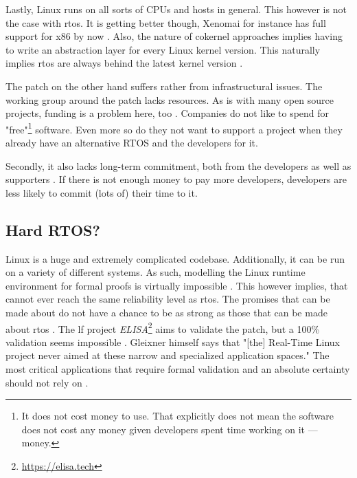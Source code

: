 \documentclass[10pt,twocolumn,a4paper]{article}
\begin{document}
Lastly, Linux runs on all sorts of CPUs and hosts in general.
This however is not the case with \acrshort{rtos}.
It is getting better though, Xenomai for instance has full support for x86 by now \cite{xenomai_supported}.
Also, the nature of cokernel approaches implies having to write an abstraction layer for every Linux kernel version.
This naturally implies \acrshort{rtos} are always behind the latest kernel version \cite{xenomai_versions}.
\newline

\noindent The  patch on the other hand suffers rather from infrastructural issues.
The working group around the patch lacks resources.
As is with many open source projects, funding is a problem here, too \cite{jason_perlow_trenches_2021}.
Companies do not like to spend for "free"\footnote{It does not cost money to use. That explicitly does not mean the software does not cost any money given developers spent time working on it --- money.} software.
Even more so do they not want to support a project when they already have an alternative RTOS and the developers for it.

Secondly, it also lacks long-term commitment, both from the developers as well as supporters \cite{jason_perlow_trenches_2021}.
If there is not enough money to pay more developers, developers are less likely to commit (lots of) their time to it.


\subsection{Hard RTOS?}
Linux is a huge and extremely complicated codebase.
Additionally, it can be run on a variety of different systems.
As such, modelling the Linux runtime environment for formal proofs is virtually impossible \cite{reghenzani_realtime_2019}.
This however implies, that  cannot ever reach the same reliability level as \acrshort{rtos}.
The promises that can be made about  do not have a chance to be as strong as those that can be made about \acrshort{rtos} \cite{reghenzani_realtime_2019}.
The \acrfull{lf} project \emph{ELISA}\footnote{\url{https://elisa.tech}} aims to validate the patch, but a 100\% validation seems impossible \cite{jason_perlow_trenches_2021}.
Gleixner himself says that "[the] Real-Time Linux project never aimed at these narrow and specialized application spaces."\cite{jason_perlow_trenches_2021}
The most critical applications that require formal validation and an absolute certainty should not rely on .
\end{document}

